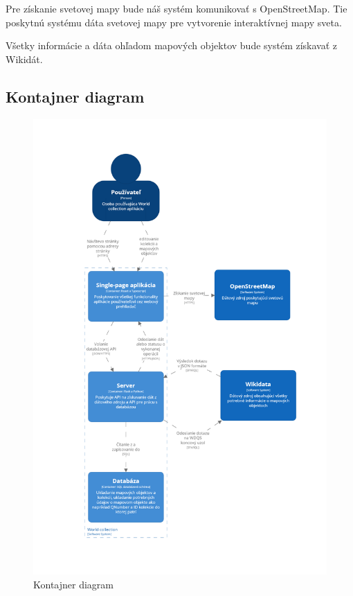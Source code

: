Pre získanie svetovej mapy bude náš systém komunikovať s OpenStreetMap. Tie  poskytnú systému dáta svetovej mapy pre vytvorenie interaktívnej mapy sveta.

Všetky informácie a dáta ohľadom mapových objektov bude systém získavať z Wikidát.

\subsection{Kontajner diagram }

\begin{figure}[h]
      \includegraphics[width=140mm]{../img/structurizr-Containers}
      \caption{Kontajner diagram }
\end{figure}

